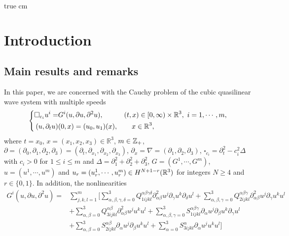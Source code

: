 \documentclass[11pt,twoside]{article}
\def\R{\mathop{\mathbb R\kern 0pt}\nolimits}
\def\p{\partial}
\theoremstyle{plain}
\theoremstyle{definition}
\numberwithin{equation}{section}
\begin{document}
 true cm

\tableofcontents





\section{Introduction}

\subsection{Main results and remarks}

In this paper, we are concerned with the Cauchy problem of the cubic quasilinear wave system with multiple speeds
\begin{equation}\label{eq:wave}
\left\{
\begin{aligned}
\square_{c_i} u^i = &G^i(u,\p u,\p^2 u), \qquad\quad (t,x)\in [0,\infty)\times\R^3,\ i = 1,\cdots,m, \\
(u,\p_tu)&(0,x)=(u_{0},u_{1})(x),\qquad x\in\R^3,
\end{aligned}
\right.
\end{equation}
where $t=x_0$, $x=(x_1, x_2, x_3)\in\mathbb{R}^3$, $m\in\Bbb Z_+$, $\partial=(\partial_0, \partial_1, \p_2, \partial_3)
=(\partial_t, \partial_{x_1}, \p_{x_2}, \partial_{x_3})$, $\partial_x=\nabla=(\partial_1, \p_2 , \partial_3)$,
$\square_{c_i}=\p_t^2-c_i^2\Delta$ with $c_i>0$ for $1\le i\le m$ and $\Delta=\p_1^2+\p_2^2+\p_3^2$, $G=(G^1, \cdots, G^m)$,
$u=(u^1, \cdots, u^m)$
and $u_{r}=(u^1_{r},\cdots,u^m_{r})\in H^{N+1-r}(\Bbb R^3)$ for integers $N\ge 4$ and $r \in \{0,1\}$.
In addition, the nonlinearities
\begin{equation}\label{eq:c}
\begin{split}
G^i(u,\p u,\p^2 u)=&
\sum_{j,k,l=1}^m\big[\sum_{\alpha,\beta,\gamma,\delta=0}^3 Q^{\alpha\beta\gamma\delta}_{1ijkl}\partial_{\alpha\beta}^2 u^j\partial_\gamma u^k \partial_\delta u^l+\sum_{\alpha,\beta,\gamma=0}^3 Q^{\alpha\beta\gamma}_{2ijkl}\partial_{\alpha\beta}^2 u^j\partial_\gamma u^k u^l\\
&+\sum_{\alpha,\beta=0}^3 Q^{\alpha\beta}_{3ijkl} \partial_{\alpha\beta}^2 u^ju^ku^l
+\sum_{\alpha,\beta,\gamma=0}^3 S^{\alpha\beta\gamma}_{1ijkl} \partial_{\alpha} u^j\partial_\beta u^k\partial_\gamma u^l\\
&+\sum_{\alpha,\beta=0}^3 S^{\alpha\beta}_{2ijkl} \partial_{\alpha} u^j\partial_\beta u^k u^l
+\sum_{\alpha=0}^3 S^{\alpha}_{3ijkl} \partial_{\alpha} u^j u^k u^l\big]
\end{split}
\end{equation}
\end{document}
